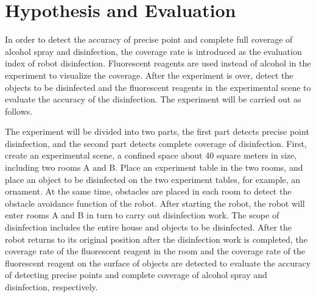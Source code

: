 \section{Hypothesis and Evaluation}\label{Sec:evaluation}

\par In order to detect the accuracy of precise point and complete full coverage of alcohol spray and disinfection, the coverage rate is introduced as the evaluation index of robot disinfection. Fluorescent reagents are used instead of alcohol in the experiment to visualize the coverage. After the experiment is over, detect the objects to be disinfected and the fluorescent reagents in the experimental scene to evaluate the accuracy of the disinfection. The experiment will be carried out as follows.
\par The experiment will be divided into two parts, the first part detects precise point disinfection, and the second part detects complete coverage of disinfection. First, create an experimental scene, a confined space about 40 square meters in size, including two rooms A and B. Place an experiment table in the two rooms, and place an object to be disinfected on the two experiment tables, for example, an ornament. At the same time, obstacles are placed in each room to detect the obstacle avoidance function of the robot. After starting the robot, the robot will enter rooms A and B in turn to carry out disinfection work. The scope of disinfection includes the entire house and objects to be disinfected. After the robot returns to its original position after the disinfection work is completed, the coverage rate of the fluorescent reagent in the room and the coverage rate of the fluorescent reagent on the surface of objects are detected to evaluate the accuracy of detecting precise points and complete coverage of alcohol spray and disinfection, respectively.



